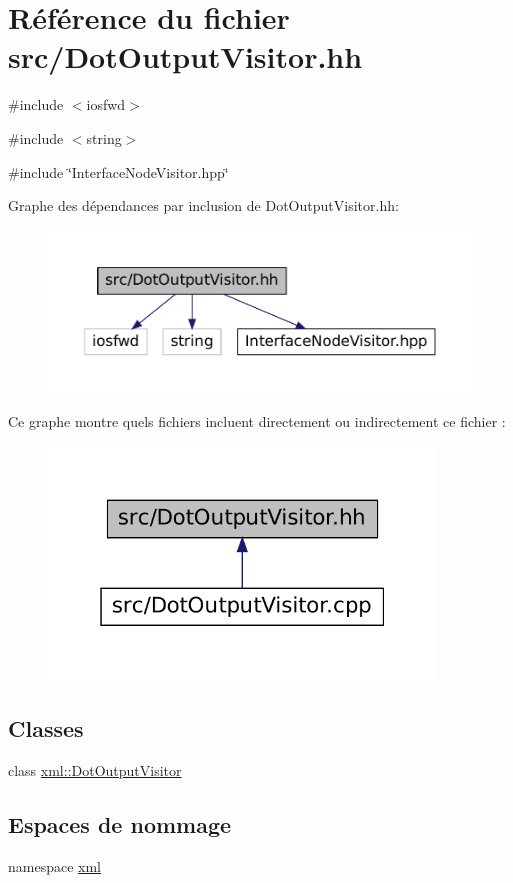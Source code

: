 \hypertarget{_dot_output_visitor_8hh}{
\section{Référence du fichier src/DotOutputVisitor.hh}
\label{_dot_output_visitor_8hh}
}
{\ttfamily \#include $<$iosfwd$>$}\par
{\ttfamily \#include $<$string$>$}\par
{\ttfamily \#include \char`\"{}InterfaceNodeVisitor.hpp\char`\"{}}\par
Graphe des dépendances par inclusion de DotOutputVisitor.hh:
\nopagebreak
\begin{figure}[H]
\begin{center}
\leavevmode
\includegraphics[width=400pt]{_dot_output_visitor_8hh__incl}
\end{center}
\end{figure}
Ce graphe montre quels fichiers incluent directement ou indirectement ce fichier :
\nopagebreak
\begin{figure}[H]
\begin{center}
\leavevmode
\includegraphics[width=292pt]{_dot_output_visitor_8hh__dep__incl}
\end{center}
\end{figure}
\subsection*{Classes}
\begin{DoxyCompactItemize}
\item 
class \hyperlink{classxml_1_1_dot_output_visitor}{xml::DotOutputVisitor}
\end{DoxyCompactItemize}
\subsection*{Espaces de nommage}
\begin{DoxyCompactItemize}
\item 
namespace \hyperlink{namespacexml}{xml}
\end{DoxyCompactItemize}
